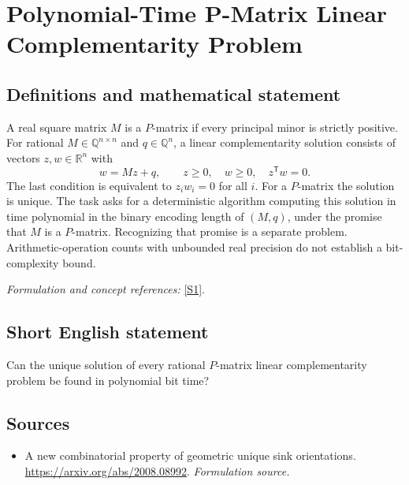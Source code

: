 \documentclass[11pt]{article}
\begin{document}
\section*{\texorpdfstring{Polynomial-Time P-Matrix Linear Complementarity Problem}{Polynomial-Time P-Matrix Linear Complementarity Problem}}\label{30006923}
\subsection{Definitions and mathematical statement}
A real square matrix $M$ is a $P$-matrix if every principal minor is strictly positive. For rational $M\in{\mathbb{Q}}^{n\times n}$ and $q\in{\mathbb{Q}}^n$, a linear complementarity solution consists of vectors $z,w\in{\mathbb{R}}^n$ with
\[
 w=Mz+q,\qquad z\ge0,\quad w\ge0,\quad z^{\mathsf T}w=0.
\]
The last condition is equivalent to $z_iw_i=0$ for all $i$. For a $P$-matrix the solution is unique. The task asks for a deterministic algorithm computing this solution in time polynomial in the binary encoding length of $(M,q)$, under the promise that $M$ is a $P$-matrix. Recognizing that promise is a separate problem. Arithmetic-operation counts with unbounded real precision do not establish a bit-complexity bound.
\par\smallskip\textit{Formulation and concept references:} \href{https://arxiv.org/abs/2008.08992}{[S1]}.

\subsection{Short English statement}
Can the unique solution of every rational $P$-matrix linear complementarity problem be found in polynomial bit time?
\subsection{Sources}
\begin{itemize}
\item[S1]A new combinatorial property of geometric unique sink orientations.
\url{https://arxiv.org/abs/2008.08992}.
\textit{Formulation source.}
\end{itemize}
\end{document}
